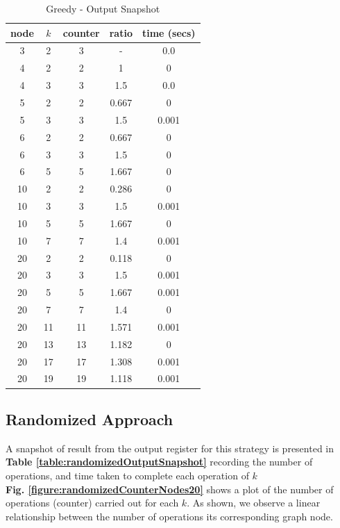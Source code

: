 \documentclass[longpaper, english, final, times]{revdetua}
\begin{document}
			\begin{table}[!h]
				{\renewcommand{\arraystretch}{1.2}
					\begin{tabular}{|c|c|c|c|c|}
						\hline
						node&$k$&counter&ratio&time (secs)\\
						\hline
						3	&2	&3	&-	&0.0\\
						\hline
						4	&2	&2	&1	&0\\
						4	&3	&3	&1.5	&0.0\\
						\hline
						5	&2	&2	&0.667	&0\\
						5	&3	&3	&1.5	&0.001\\
						\hline
						6	&2	&2	&0.667	&0\\
						6	&3	&3	&1.5	&0\\
						6	&5	&5	&1.667	&0\\
						\hline
						10	&2	&2	&0.286	&0\\
						10	&3	&3	&1.5	&0.001\\
						10	&5	&5	&1.667	&0\\
						10	&7	&7	&1.4	&0.001\\
						\hline
						20	&2	&2	&0.118	&0\\
						20	&3	&3	&1.5	&0.001\\
						20	&5	&5	&1.667	&0.001\\
						20	&7	&7	&1.4	&0\\
						20	&11	&11	&1.571	&0.001\\
						20	&13	&13	&1.182	&0\\
						20	&17	&17	&1.308 &0.001\\
						20	&19	&19	&1.118	&0.001\\
						\hline
					\end{tabular}
				}
				\caption{Greedy - Output Snapshot}
				\label{table:greedyOutputSnapshot}
			\end{table}
		
		\newpage
		\subsection{Randomized Approach}
			A snapshot of result from the output register for this strategy is presented in \textbf{Table \ref{table:randomizedOutputSnapshot}} recording the number of operations, and time taken to complete each operation of $k$\\
			
			\textbf{Fig. \ref{figure:randomizedCounterNodes20}} shows a plot of the number of operations (counter) carried out for each $k$. As shown, we observe a linear relationship between the number of operations its corresponding graph node.\\
		
\end{document}
